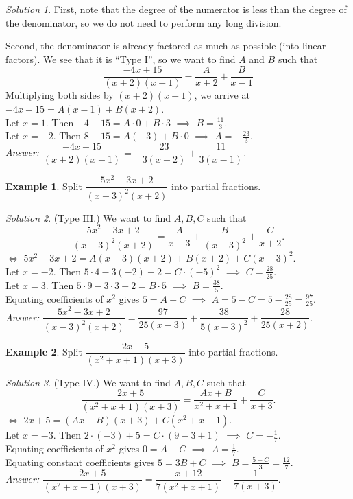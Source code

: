 \documentclass[
  12pt,
  oneside]{book}
\theoremstyle{definition}
\theoremstyle{definition}
\newtheorem{example}{Example}[chapter]
\theoremstyle{definition}
\theoremstyle{definition}
\theoremstyle{remark}
\newtheorem*{solution}{Solution}
\begin{document}
\begin{solution}
First, note that the degree of the numerator is less than the degree of the denominator, so we do not need to perform any long division.

Second, the denominator is already factored as much as possible (into linear factors). We see that it is ``Type I'', so we want to find \(A\) and \(B\) such that
\[
\frac{-4x+15}{(x+2)(x-1)} = \frac{A}{x+2}+\frac{B}{x-1}
\]
Multiplying both sides by \((x+2)(x-1)\), we arrive at\\
\(-4x+15 = A(x-1)+B(x+2)\).\\
Let \(x=1\). Then \(-4+15 = A\cdot 0+B\cdot 3\) \(\implies\) \(B=\frac{11}{3}\).\\
Let \(x=-2\). Then \(8+15=A(-3)+B\cdot 0\) \(\implies\) \(A=-\frac{23}{3}\).\\
\emph{Answer:}
\(\dfrac{-4x+15}{(x+2)(x-1)} = -\dfrac{23}{3(x+2)}+\dfrac{11}{3(x-1)}.\)
\end{solution}

\begin{example}
Split \(\dfrac{5x^2-3x+2}{(x-3)^2(x+2)}\) into partial fractions.
\end{example}

\begin{solution}
(Type III.) We want to find \(A,B,C\) such that
\[
\frac{5x^2-3x+2}{(x-3)^2(x+2)}=\frac{A}{x-3}+\frac{B}{(x-3)^2}+\frac{C}{x+2}.
\]
\(\iff\) \(5x^2-3x+2 = A(x-3)(x+2)+B(x+2)+C(x-3)^2\).\\
Let \(x=-2\). Then \(5\cdot 4-3(-2)+2 = C\cdot(-5)^2\) \(\implies\) \(C=\frac{28}{25}\).\\
Let \(x=3\). Then \(5\cdot 9-3\cdot 3+2 = B\cdot 5\) \(\implies\) \(B=\frac{38}{5}\).\\
Equating coefficients of \(x^2\) gives \(5=A+C\) \(\implies\) \(A=5-C=5-\frac{28}{25}=\frac{97}{25}\).\\
\emph{Answer:}
\(\dfrac{5x^2-3x+2}{(x-3)^2(x+2)}=\dfrac{97}{25(x-3)}+\dfrac{38}{5(x-3)^2}+\dfrac{28}{25(x+2)}.\)
\end{solution}

\begin{example}
Split \(\dfrac{2x+5}{(x^2+x+1)(x+3)}\) into partial fractions.
\end{example}

\begin{solution}
(Type IV.) We want to find \(A,B,C\) such that
\[\dfrac{2x+5}{(x^2+x+1)(x+3)}=\dfrac{Ax+B}{x^2+x+1}+\dfrac{C}{x+3}.\]
\(\iff\) \(2x+5=(Ax+B)(x+3)+C(x^2+x+1)\).\\
Let \(x=-3\). Then \(2\cdot(-3)+5=C\cdot(9-3+1)\) \(\implies\) \(C=-\frac17\).\\
Equating coefficients of \(x^2\) gives \(0=A+C\) \(\implies\) \(A=\frac17\).\\
Equating constant coefficients gives \(5=3B+C\) \(\implies\) \(B=\frac{5-C}{3}=\frac{12}7\).\\
\emph{Answer:}
\(\dfrac{2x+5}{(x^2+x+1)(x+3)}=\dfrac{x+12}{7(x^2+x+1)}-\dfrac{1}{7(x+3)}.\)
\end{solution}
\end{document}
